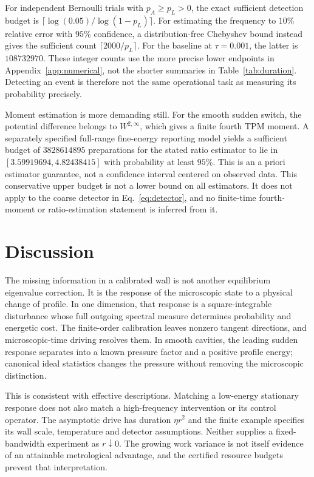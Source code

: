 \documentclass[aps,pra,reprint,superscriptaddress,longbibliography]{revtex4-2}
\begin{document}
For independent Bernoulli trials with $p_A\ge p_L>0$, the exact sufficient detection budget is $\lceil\log(0.05)/\log(1-p_L)\rceil$. For estimating the frequency to $10\%$ relative error with $95\%$ confidence, a distribution-free Chebyshev bound instead gives the sufficient count $\lceil2000/p_L\rceil$. For the baseline at $\tau=0.001$, the latter is $108732970$. These integer counts use the more precise lower endpoints in Appendix~\ref{app:numerical}, not the shorter summaries in Table~\ref{tab:duration}. Detecting an event is therefore not the same operational task as measuring its probability precisely.

Moment estimation is more demanding still. For the smooth sudden switch, the potential difference belongs to $W^{2,\infty}$, which gives a finite fourth TPM moment. A separately specified full-range fine-energy reporting model yields a sufficient budget of $3828614895$ preparations for the stated ratio estimator to lie in $[3.59919694,4.82438415]$ with probability at least $95\%$. This is an a priori estimator guarantee, not a confidence interval centered on observed data. This conservative upper budget is not a lower bound on all estimators. It does not apply to the coarse detector in Eq.~\eqref{eq:detector}, and no finite-time fourth-moment or ratio-estimation statement is inferred from it.

\section{Discussion}

The missing information in a calibrated wall is not another equilibrium eigenvalue correction. It is the response of the microscopic state to a physical change of profile. In one dimension, that response is a square-integrable disturbance whose full outgoing spectral measure determines probability and energetic cost. The finite-order calibration leaves nonzero tangent directions, and microscopic-time driving resolves them. In smooth cavities, the leading sudden response separates into a known pressure factor and a positive profile energy; canonical ideal statistics changes the pressure without removing the microscopic distinction.

This is consistent with effective descriptions. Matching a low-energy stationary response does not also match a high-frequency intervention or its control operator. The asymptotic drive has duration $\eta r^2$ and the finite example specifies its wall scale, temperature and detector assumptions. Neither supplies a fixed-bandwidth experiment as $r\downarrow0$. The growing work variance is not itself evidence of an attainable metrological advantage, and the certified resource budgets prevent that interpretation.
\end{document}

